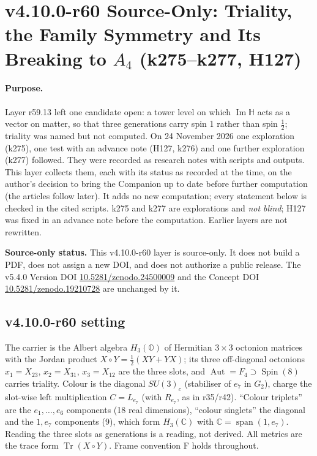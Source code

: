 
\clearpage
\section*{v4.10.0-r60 Source-Only: Triality, the Family Symmetry and Its Breaking to \texorpdfstring{\(A_4\)}{A4} (k275--k277, H127)}
\label{sec:v4100-r60-triality-a4}

\paragraph{Purpose.}
Layer r59.13 left one candidate open: a tower level on which \(\operatorname{Im}\mathbb H\) acts as a vector on matter, so that three generations
carry spin 1 rather than spin \(\tfrac12\); triality was named but not computed.  On 24 November 2026 one exploration (k275), one test with an
advance note (H127, k276) and one further exploration (k277) followed.  They were recorded as research notes with scripts and outputs.  This
layer collects them, each with its status as recorded at the time, on the author's decision to bring the Companion up to date before further
computation (the articles follow later).  It adds no new computation; every statement below is checked in the cited scripts.  k275 and k277 are
explorations and \emph{not blind}; H127 was fixed in an advance note before the computation.  Earlier layers are not rewritten.

\noindent\textbf{Source-only status.}
This v4.10.0-r60 layer is source-only.  It does not build a PDF, does not assign a new DOI,
and does not authorize a public release.  The v5.4.0 Version DOI
\href{https://doi.org/10.5281/zenodo.24500009}{10.5281/zenodo.24500009} and the Concept DOI
\href{https://doi.org/10.5281/zenodo.19210728}{10.5281/zenodo.19210728} are unchanged by it.

\subsection*{v4.10.0-r60 setting}
\label{subsec:v4100-r60-setting}

The carrier is the Albert algebra \(H_3(\mathbb O)\) of Hermitian \(3\times3\) octonion matrices with the Jordan product \(X\circ Y=\tfrac12(XY+YX)\);
its three off-diagonal octonions \(x_1=X_{23}\), \(x_2=X_{31}\), \(x_3=X_{12}\) are the three slots, and \(\operatorname{Aut}=F_4\supset\operatorname{Spin}(8)\) carries
triality.  Colour is the diagonal \(SU(3)_c\) (stabiliser of \(e_7\) in \(G_2\)), charge the slot-wise left multiplication
\(C=L_{e_7}\) (with \(R_{e_7}\), as in r35/r42).  ``Colour triplets'' are the \(e_1,\dots,e_6\) components (18 real dimensions), ``colour singlets'' the
diagonal and the \(1,e_7\) components (9), which form \(H_3(\mathbb C)\) with \(\mathbb C=\operatorname{span}(1,e_7)\).  Reading the three slots as
generations is a reading, not derived.  All metrics are the trace form \(\operatorname{Tr}(X\circ Y)\).  Frame convention F holds throughout.

